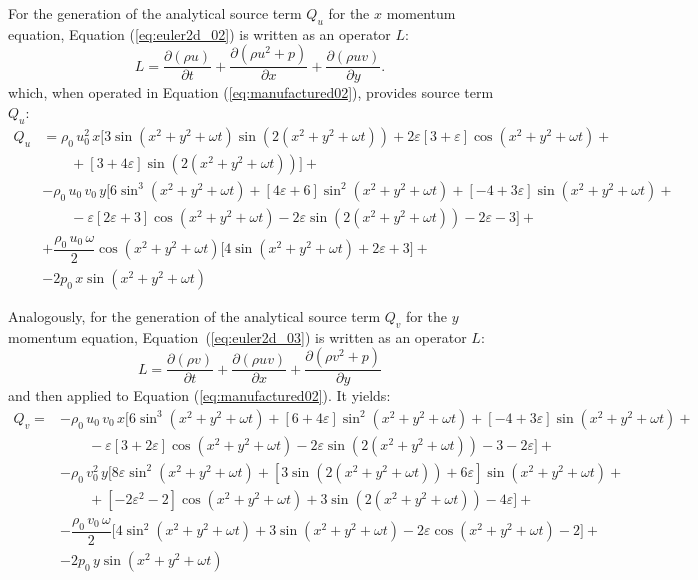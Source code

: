 \documentclass[10pt]{article}
\newcommand{\Diff}[2] {\dfrac{\partial( #1)}{\partial #2}}
\begin{document}
For the generation of the analytical source term $Q_u$ for the $x$ momentum equation, Equation  (\ref{eq:euler2d_02}) is written as an  operator $L$:
\begin{equation}
 \label{eq:euler2d_12}
L=\Diff{\rho u}{t} + \Diff{\rho u^2 + p}{x}+\Diff{\rho uv}{y}.
\end{equation}
which, when operated in Equation (\ref{eq:manufactured02}), provides source term $Q_{u}$:
\begin{equation}
\begin{split}
Q_u
&= \rho_0\, u_0^2\,  x \Big[3 \sin(x^2+y^2+\omega t) \sin\left(2(x^2+y^2+\omega t)\right)+2 \varepsilon [3+\varepsilon] \cos(x^2+y^2+\omega t)+ \\
    &\qquad+[3+4 \varepsilon] \sin\left(2(x^2+y^2+\omega t)\right)\Big]+ \\
&- \rho_0\, u_0\, v_0\, y\Big[6 \sin^3(x^2+y^2+\omega t)+[4 \varepsilon+6] \sin^2(x^2+y^2+\omega t)+[-4+3 \varepsilon] \sin(x^2+y^2+\omega t)+ \\
    &\qquad-\varepsilon [2 \varepsilon+3] \cos(x^2+y^2+\omega t)-2 \varepsilon \sin\left(2(x^2+y^2+\omega t)\right)-2 \varepsilon-3\Big] + \\
&+ \dfrac{\rho_0\, u_0\, \omega }{2} \cos(x^2+y^2+\omega t)\Big[4 \sin(x^2+y^2+\omega t)+2 \varepsilon+3\Big] + \\
&-2 p_0\, x \sin(x^2+y^2+\omega t)
\end{split}
 \end{equation}

Analogously, for the generation of the analytical source term $Q_v$ for the $y$ momentum equation, Equation~(\ref{eq:euler2d_03}) is written as an  operator $L$:
\begin{equation}
  \label{eq:euler2d_13}
  L = \Diff{\rho v}{t}+ \Diff{\rho u v}{x} + \Diff{\rho  v^2 + p}{y}
\end{equation}
and then applied to Equation  (\ref{eq:manufactured02}). It yields:
\begin{equation}
\begin{split}
Q_v
=&-\rho_0\, u_0\, v_0\, x \Big[6 \sin^3(x^2+y^2+\omega t)+[6+4 \varepsilon] \sin^2(x^2+y^2+\omega t)+[-4+3 \varepsilon] \sin(x^2+y^2+\omega t)+ \\
    &\qquad-\varepsilon [3+2 \varepsilon] \cos(x^2+y^2+\omega t)-2 \varepsilon \sin\left(2(x^2+y^2+\omega t)\right)-3-2 \varepsilon\Big]+ \\
&-\rho_0\, v_0^2\,  y\Big[8 \varepsilon \sin^2(x^2+y^2+\omega t)+[3 \sin\left(2(x^2+y^2+\omega t)\right)+6 \varepsilon] \sin(x^2+y^2+\omega t)+ \\
    &\qquad+[-2 \varepsilon^2-2] \cos(x^2+y^2+\omega t)+3 \sin\left(2(x^2+y^2+\omega t)\right)-4 \varepsilon\Big] + \\
&-\dfrac{ \rho_0\, v_0\, \omega}{2} \Big[4 \sin^2(x^2+y^2+\omega t)+3 \sin(x^2+y^2+\omega t)-2 \varepsilon \cos(x^2+y^2+\omega t)-2\Big]+ \\
&-2 p_0\, y \sin(x^2+y^2+\omega t)
 \end{split}
\end{equation}
\end{document}
